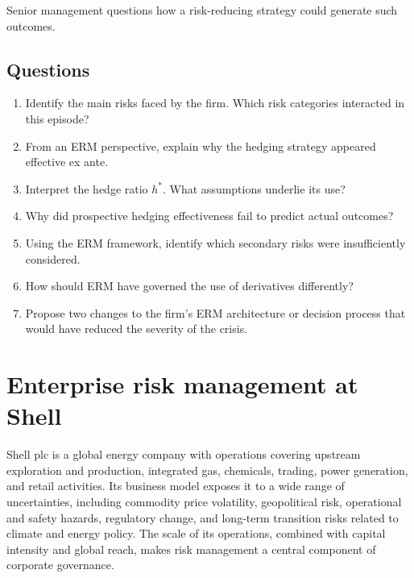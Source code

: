 \documentclass[11pt]{article}
\begin{document}
Senior management questions how a risk-reducing strategy could generate such
outcomes.

\subsection*{Questions}

\begin{enumerate}
  \item Identify the main risks faced by the firm. Which risk categories
  interacted in this episode?

  \item From an ERM perspective, explain why the hedging strategy appeared
  effective ex ante.

  \item Interpret the hedge ratio $h^*$. What assumptions underlie its use?

  \item Why did prospective hedging effectiveness fail to predict actual
  outcomes?

  \item Using the ERM framework, identify which secondary risks were
  insufficiently considered.

  \item How should ERM have governed the use of derivatives differently?

  \item Propose two changes to the firm’s ERM architecture or decision process
  that would have reduced the severity of the crisis.
\end{enumerate}

\pagebreak

\section{Enterprise risk management at Shell}

Shell plc is a global energy company with operations covering upstream
exploration and production, integrated gas, chemicals, trading, power
generation, and retail activities. Its business model exposes it to a wide
range of uncertainties, including commodity price volatility, geopolitical
risk, operational and safety hazards, regulatory change, and long-term
transition risks related to climate and energy policy. The scale of its
operations, combined with capital intensity and global reach, makes risk
management a central component of corporate governance.
\end{document}
